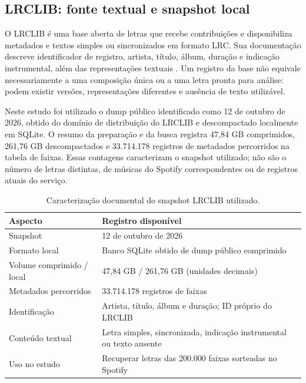 \FloatBarrier
\subsection{LRCLIB: fonte textual e snapshot local}\label{subsec:lrclib}
O LRCLIB é uma base aberta de letras que recebe contribuições e disponibiliza metadados e textos simples ou sincronizados em formato LRC. Sua documentação descreve identificador de registro, artista, título, álbum, duração e indicação instrumental, além das representações textuais \cite{lrclib}. Um registro da base não equivale necessariamente a uma composição única ou a uma letra pronta para análise: podem existir versões, representações diferentes e ausência de texto utilizável.

Neste estudo foi utilizado o dump público identificado como 12 de outubro de 2026, obtido do domínio de distribuição do LRCLIB e descompactado localmente em SQLite. O resumo da preparação e da busca registra 47,84 GB comprimidos, 261,76 GB descompactados e 33.714.178 registros de metadados percorridos na tabela de faixas. Essas contagens caracterizam o snapshot utilizado; não são o número de letras distintas, de músicas do Spotify correspondentes ou de registros atuais do serviço.

\begin{table}[htbp]\centering\small
\caption{Caracterização documental do snapshot LRCLIB utilizado.}\label{tab:lrclib}
\begin{tabular}{P{.40\linewidth}P{.52\linewidth}}\toprule
Aspecto & Registro disponível \\\midrule
Snapshot & 12 de outubro de 2026 \\
Formato local & Banco SQLite obtido de dump público comprimido \\
Volume comprimido / local & 47,84 GB / 261,76 GB (unidades decimais) \\
Metadados percorridos & 33.714.178 registros de faixas \\
Identificação & Artista, título, álbum e duração; ID próprio do LRCLIB \\
Conteúdo textual & Letra simples, sincronizada, indicação instrumental ou texto ausente \\
Uso no estudo & Recuperar letras das 200.000 faixas sorteadas no Spotify \\
\bottomrule\end{tabular}
\end{table}

